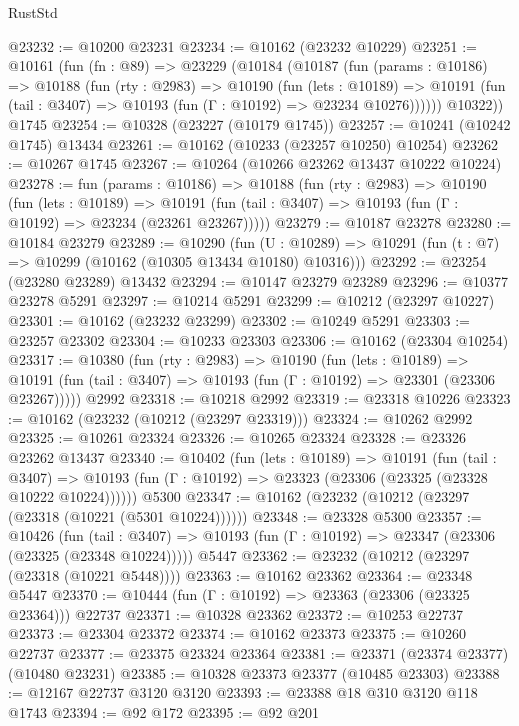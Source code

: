 \begin{lexlean}{RustStd}
\begin{coremodule}
@23232 := @10200 @23231
@23234 := @10162 (@23232 @10229)
@23251 := @10161
    (fun (fn : @89) =>
    @23229
      (@10184
        (@10187
          (fun (params : @10186) =>
          @10188
            (fun (rty : @2983) =>
            @10190
              (fun (lets : @10189) =>
              @10191 (fun (tail : @3407) => @10193 (fun (Γ : @10192) => @23234 @10276))))))
        @10322))
    @1745
@23254 := @10328 (@23227 (@10179 @1745))
@23257 := @10241 (@10242 @1745) @13434
@23261 := @10162 (@10233 (@23257 @10250) @10254)
@23262 := @10267 @1745
@23267 := @10264 (@10266 @23262 @13437 @10222 @10224)
@23278 := fun (params : @10186) =>
  @10188
    (fun (rty : @2983) =>
    @10190
      (fun (lets : @10189) =>
      @10191 (fun (tail : @3407) => @10193 (fun (Γ : @10192) => @23234 (@23261 @23267)))))
@23279 := @10187 @23278
@23280 := @10184 @23279
@23289 := @10290
    (fun (U : @10289) => @10291 (fun (t : @7) => @10299 (@10162 (@10305 @13434 @10180) @10316)))
@23292 := @23254 (@23280 @23289) @13432
@23294 := @10147 @23279 @23289
@23296 := @10377 @23278 @5291
@23297 := @10214 @5291
@23299 := @10212 (@23297 @10227)
@23301 := @10162 (@23232 @23299)
@23302 := @10249 @5291
@23303 := @23257 @23302
@23304 := @10233 @23303
@23306 := @10162 (@23304 @10254)
@23317 := @10380
    (fun (rty : @2983) =>
    @10190
      (fun (lets : @10189) =>
      @10191 (fun (tail : @3407) => @10193 (fun (Γ : @10192) => @23301 (@23306 @23267)))))
    @2992
@23318 := @10218 @2992
@23319 := @23318 @10226
@23323 := @10162 (@23232 (@10212 (@23297 @23319)))
@23324 := @10262 @2992
@23325 := @10261 @23324
@23326 := @10265 @23324
@23328 := @23326 @23262 @13437
@23340 := @10402
    (fun (lets : @10189) =>
    @10191
      (fun (tail : @3407) =>
      @10193 (fun (Γ : @10192) => @23323 (@23306 (@23325 (@23328 @10222 @10224))))))
    @5300
@23347 := @10162 (@23232 (@10212 (@23297 (@23318 (@10221 (@5301 @10224))))))
@23348 := @23328 @5300
@23357 := @10426
    (fun (tail : @3407) => @10193 (fun (Γ : @10192) => @23347 (@23306 (@23325 (@23348 @10224)))))
    @5447
@23362 := @23232 (@10212 (@23297 (@23318 (@10221 @5448))))
@23363 := @10162 @23362
@23364 := @23348 @5447
@23370 := @10444 (fun (Γ : @10192) => @23363 (@23306 (@23325 @23364))) @22737
@23371 := @10328 @23362
@23372 := @10253 @22737
@23373 := @23304 @23372
@23374 := @10162 @23373
@23375 := @10260 @22737
@23377 := @23375 @23324 @23364
@23381 := @23371 (@23374 @23377) (@10480 @23231)
@23385 := @10328 @23373 @23377 (@10485 @23303)
@23388 := @12167 @22737 @3120 @3120
@23393 := @23388 @18 @310 @3120 @118 @1743
@23394 := @92 @172
@23395 := @92 @201

\end{coremodule}
\end{lexlean}
